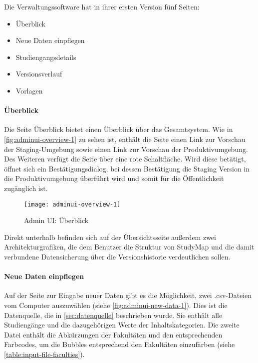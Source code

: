 \noindent
Die Verwaltungssoftware hat in ihrer ersten Version fünf Seiten:
\begin{itemize}
    \item Überblick
    \item Neue Daten einpflegen
    \item Studiengangsdetails
    \item Versionsverlauf
    \item Vorlagen
\end{itemize}

\paragraph*{Überblick}
Die Seite \glqq Überblick\grqq{} bietet einen Überblick über das Gesamtsystem. Wie in \autoref{fig:adminui-overview-1} zu sehen ist, enthält die Seite einen Link zur Vorschau der Staging-Umgebung sowie einen Link zur Vorschau der Produktivumgebung. Des Weiteren verfügt die Seite über eine rote Schaltfläche. Wird diese betätigt, öffnet sich ein Bestätigungsdialog, bei dessen Bestätigung die Staging Version in die Produktivumgebung überführt wird und somit für die Öffentlichkeit zugänglich ist.

\begin{figure}[H]
    \centering
    \texttt{[image: adminui-overview-1]}
    \caption{Admin UI: Überblick}
    \label{fig:adminui-overview-1}
\end{figure}

Direkt unterhalb befinden sich auf der Übersichtsseite außerdem zwei Architekturgrafiken, die dem Benutzer die Struktur von StudyMap und die damit verbundene Datensicherung über die Versionshistorie verdeutlichen sollen.

\paragraph*{Neue Daten einpflegen}
Auf der Seite zur Eingabe neuer Daten gibt es die Möglichkeit, zwei .csv-Dateien vom Computer auszuwählen (siehe \autoref{fig:adminui-new-data-1}). Dies ist die Datenquelle, die in \autoref{sec:datenquelle} beschrieben wurde. Sie enthält alle Studiengänge und die dazugehörigen Werte der Inhaltskategorien. Die zweite Datei enthält die Abkürzungen der Fakultäten und den entsprechenden Farbcodes, um die Bubbles entsprechend den Fakultäten einzufärben (siehe \autoref{table:input-file-faculties}).

